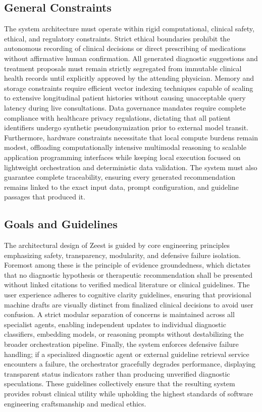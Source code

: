 \subsection{General Constraints}
The system architecture must operate within rigid computational, clinical safety, ethical, and regulatory constraints. Strict ethical boundaries prohibit the autonomous recording of clinical decisions or direct prescribing of medications without affirmative human confirmation. All generated diagnostic suggestions and treatment proposals must remain strictly segregated from immutable clinical health records until explicitly approved by the attending physician. Memory and storage constraints require efficient vector indexing techniques capable of scaling to extensive longitudinal patient histories without causing unacceptable query latency during live consultations. Data governance mandates require complete compliance with healthcare privacy regulations, dictating that all patient identifiers undergo synthetic pseudonymization prior to external model transit. Furthermore, hardware constraints necessitate that local compute burdens remain modest, offloading computationally intensive multimodal reasoning to scalable application programming interfaces while keeping local execution focused on lightweight orchestration and deterministic data validation. The system must also guarantee complete traceability, ensuring every generated recommendation remains linked to the exact input data, prompt configuration, and guideline passages that produced it.

\subsection{Goals and Guidelines}
The architectural design of Zeest is guided by core engineering principles emphasizing safety, transparency, modularity, and defensive failure isolation. Foremost among these is the principle of evidence groundedness, which dictates that no diagnostic hypothesis or therapeutic recommendation shall be presented without linked citations to verified medical literature or clinical guidelines. The user experience adheres to cognitive clarity guidelines, ensuring that provisional machine drafts are visually distinct from finalized clinical decisions to avoid user confusion. A strict modular separation of concerns is maintained across all specialist agents, enabling independent updates to individual diagnostic classifiers, embedding models, or reasoning prompts without destabilizing the broader orchestration pipeline. Finally, the system enforces defensive failure handling; if a specialized diagnostic agent or external guideline retrieval service encounters a failure, the orchestrator gracefully degrades performance, displaying transparent status indicators rather than producing unverified diagnostic speculations. These guidelines collectively ensure that the resulting system provides robust clinical utility while upholding the highest standards of software engineering craftsmanship and medical ethics.

